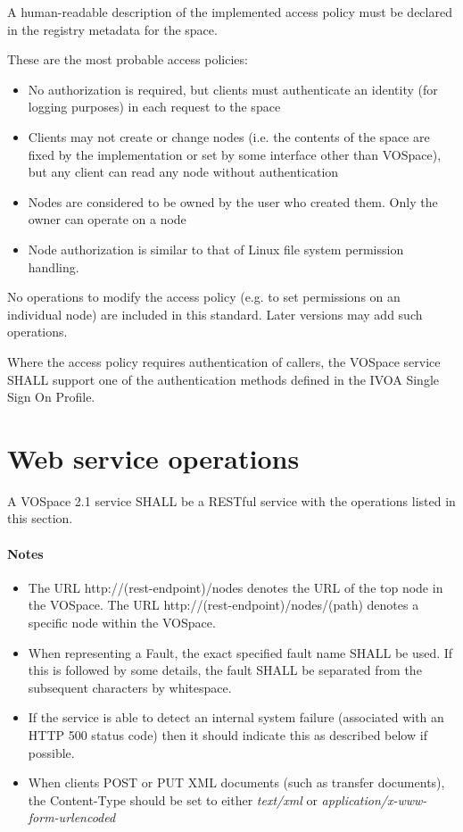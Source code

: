 \documentclass[11pt,a4paper]{ivoa}
\begin{document}
A human-readable description of the implemented access policy must be declared in the registry metadata for the space.

These are the most probable access policies:

\begin{itemize}
    \item No authorization is required, but clients must authenticate an identity (for logging purposes) in each request to the space
    \item Clients may not create or change nodes (i.e. the contents of the space are fixed by the implementation or set by some interface other than VOSpace), but any client can read any node without authentication
    \item Nodes are considered to be owned by the user who created them. Only the owner can operate on a node
    \item Node authorization is similar to that of Linux file system permission handling.
\end{itemize}

No operations to modify the access policy (e.g. to set permissions on an individual node) are included in this standard. Later versions may add such operations.

Where the access policy requires authentication of callers, the VOSpace service SHALL support one of the authentication methods defined in the IVOA Single Sign On Profile.

\section{Web service operations}
\label{sec:web service operations}

A VOSpace 2.1 service SHALL be a RESTful service with the operations listed in this section.

\paragraph{Notes}
\begin{itemize}
    \item The URL http://(rest-endpoint)/nodes denotes the URL of the top node in the VOSpace. The URL http://(rest-endpoint)/nodes/(path) denotes a specific node within the VOSpace.
    \item When representing a Fault, the exact specified fault name SHALL be used. If this is followed by some details, the fault SHALL be separated from the subsequent characters by whitespace.
    \item If the service is able to detect an internal system failure (associated with an HTTP 500 status code) then it should indicate this as described below if possible.
    \item When clients POST or PUT XML documents (such as transfer documents), the Content-Type should be set to either \emph{text/xml} or \emph{application/x-www-form-urlencoded}
\end{itemize}
\end{document}

